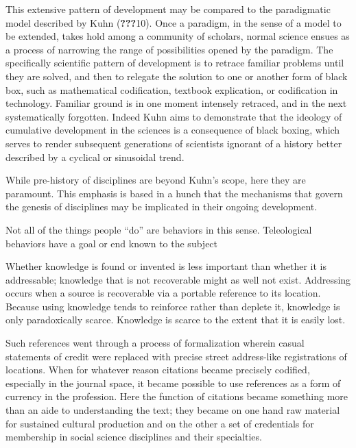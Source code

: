 This extensive pattern of development may be compared to the
paradigmatic model described by Kuhn ({\textbf{???}}10). Once a
paradigm, in the sense of a model to be extended, takes hold among a
community of scholars, normal science ensues as a process of narrowing
the range of possibilities opened by the paradigm. The specifically
scientific pattern of development is to retrace familiar problems until
they are solved, and then to relegate the solution to one or another
form of black box, such as mathematical codification, textbook
explication, or codification in technology. Familiar ground is in one
moment intensely retraced, and in the next systematically forgotten.
Indeed Kuhn aims to demonstrate that the ideology of cumulative
development in the sciences is a consequence of black boxing, which
serves to render subsequent generations of scientists ignorant of a
history better described by a cyclical or sinusoidal trend.

While pre-history of disciplines are beyond Kuhn's scope, here they are
paramount. This emphasis is based in a hunch that the mechanisms that
govern the genesis of disciplines may be implicated in their ongoing
development.

Not all of the things people ``do'' are behaviors in this sense.
Teleological behaviors have a goal or end known to the subject

Whether knowledge is found or invented is less important than whether it
is addressable; knowledge that is not recoverable might as well not
exist. Addressing occurs when a source is recoverable via a portable
reference to its location. Because using knowledge tends to reinforce
rather than deplete it, knowledge is only paradoxically scarce.
Knowledge is scarce to the extent that it is easily lost.

Such references went through a process of formalization wherein casual
statements of credit were replaced with precise street address-like
registrations of locations. When for whatever reason citations became
precisely codified, especially in the journal space, it became possible
to use references as a form of currency in the profession. Here the
function of citations became something more than an aide to
understanding the text; they became on one hand raw material for
sustained cultural production and on the other a set of credentials for
membership in social science disciplines and their specialties.

